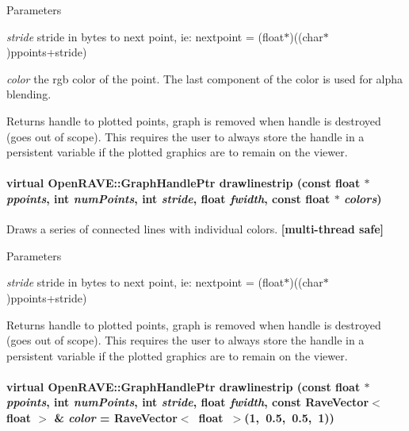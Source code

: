 \begin{DoxyParams}{Parameters}
\item[{\em stride}]stride in bytes to next point, ie: nextpoint = (float$\ast$)((char$\ast$)ppoints+stride) \item[{\em color}]the rgb color of the point. The last component of the color is used for alpha blending. \end{DoxyParams}
\begin{DoxyReturn}{Returns}
handle to plotted points, graph is removed when handle is destroyed (goes out of scope). This requires the user to always store the handle in a persistent variable if the plotted graphics are to remain on the viewer. 
\end{DoxyReturn}
\hypertarget{classOpenRAVE_1_1EnvironmentBase_ac1aba9c68455f30fe87d62624a31b1a6}{
\paragraph[{drawlinestrip}]{\setlength{\rightskip}{0pt plus 5cm}virtual OpenRAVE::GraphHandlePtr drawlinestrip (const float $\ast$ {\em ppoints}, \/  int {\em numPoints}, \/  int {\em stride}, \/  float {\em fwidth}, \/  const float $\ast$ {\em colors})}\hfill}
\label{classOpenRAVE_1_1EnvironmentBase_ac1aba9c68455f30fe87d62624a31b1a6}


Draws a series of connected lines with individual colors. {\bfseries \mbox{[}multi-\/thread safe\mbox{]}} 


\begin{DoxyParams}{Parameters}
\item[{\em stride}]stride in bytes to next point, ie: nextpoint = (float$\ast$)((char$\ast$)ppoints+stride) \end{DoxyParams}
\begin{DoxyReturn}{Returns}
handle to plotted points, graph is removed when handle is destroyed (goes out of scope). This requires the user to always store the handle in a persistent variable if the plotted graphics are to remain on the viewer. 
\end{DoxyReturn}
\hypertarget{classOpenRAVE_1_1EnvironmentBase_a378e5e874d3a39868cd787e5936cf7fa}{
\paragraph[{drawlinestrip}]{\setlength{\rightskip}{0pt plus 5cm}virtual OpenRAVE::GraphHandlePtr drawlinestrip (const float $\ast$ {\em ppoints}, \/  int {\em numPoints}, \/  int {\em stride}, \/  float {\em fwidth}, \/  const RaveVector$<$ float $>$ \& {\em color} = {\ttfamily RaveVector$<$~float~$>$(1,~0.5,~0.5,~1)})}\hfill}
\label{classOpenRAVE_1_1EnvironmentBase_a378e5e874d3a39868cd787e5936cf7fa}


